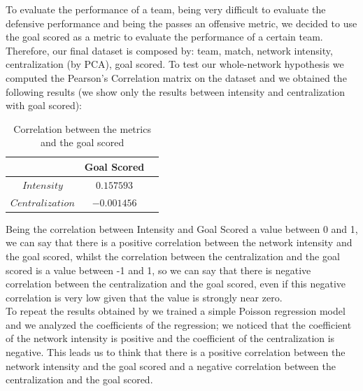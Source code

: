 \documentclass[12pt, a4paper]{article}
\begin{document}
To evaluate the performance of a team, being very difficult to evaluate the defensive performance and being the passes an offensive metric, we decided to use the goal scored as a metric to evaluate the performance of a certain team. \\
Therefore, our final dataset is composed by: team, match, network intensity, centralization (by PCA), goal scored.
To test our whole-network hypothesis we computed the Pearson's Correlation matrix on the dataset and we obtained the following results (we show only the results between intensity and centralization with goal scored):
\begin{table}[H]
        \centering
        \begin{tabular}{|c|c|c|}
                \hline
                & \textbf{Goal Scored}  \\
                \hline
                $Intensity$  &  $0.157593$  \\
                \hline
                $Centralization$  &  $-0.001456$ \\
                \hline
        \end{tabular}
        \caption{Correlation between the metrics and the goal scored}
    \end{table}
Being the correlation between Intensity and Goal Scored a value between 0 and 1, we can say that there is a positive correlation between the network intensity and the goal scored, whilst the correlation between the centralization and the goal scored is a value between -1 and 1, so we can say that there is negative correlation between the centralization and the goal scored, even if this negative correlation is very low given that the value is strongly near zero. \\
To repeat the results obtained by \cite{GRUND} we trained a simple Poisson regression model and we analyzed the coefficients of the regression; we noticed that the coefficient of the network intensity is positive and the coefficient of the centralization is negative. This leads us to think that there is a positive correlation between the network intensity and the goal scored and a negative correlation between the centralization and the goal scored. \\
\end{document}
